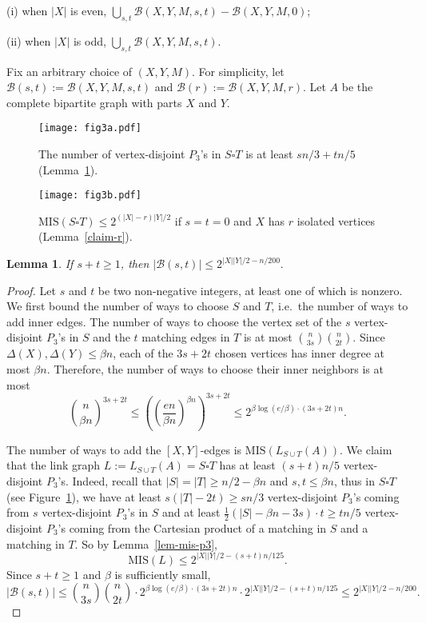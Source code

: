 \documentclass[12pt]{article}
\newtheorem{lemma}[theorem]{Lemma}
\theoremstyle{definition}
\theoremstyle{definition}
\theoremstyle{definition}
\theoremstyle{definition}
\theoremstyle{definition}
\theoremstyle{definition}
\theoremstyle{definition}
\newcommand{\De}{\Delta}
\newcommand{\cB}{\mathcal{B}}
\newcommand{\3}{\bf{3}}
\newcommand{\MIS}{\mathrm{MIS}}
\newcommand{\setm}{-}
\begin{document}
(i) when $|X|$ is even, $\bigcup_{s,t}\cB(X,Y,M,s,t)\setm \cB(X,Y,M,0)$;

(ii) when $|X|$ is odd, $\bigcup_{s,t}\cB(X,Y,M,s,t)$.

Fix an arbitrary choice of $(X,Y,M)$. For simplicity, let $\cB(s,t):=\cB(X,Y,M,s,t)$ and $\cB(r):=\cB(X,Y,M,r)$. Let $A$ be the complete bipartite graph with parts $X$ and $Y$. 

\begin{figure*}[t!]
    \centering
    \begin{subfigure}[t]{0.43\textwidth}
        \centering
        \texttt{[image: fig3a.pdf]}
        \caption{The number of vertex-disjoint $P_3$'s in $S\square T$ is at least $sn/3+tn/5$ (Lemma~\ref{claim-st}).}\label{fig3a}
    \end{subfigure}
    \hspace{0.1\textwidth}
        \begin{subfigure}[t]{0.43\textwidth}
        \centering
        \texttt{[image: fig3b.pdf]}
    \caption{$\MIS(S\square T)\le 2^{(|X|-r)|Y|/2}$ if $s=t=0$ and $X$ has $r$ isolated vertices  (Lemma~\ref{claim-r}).} \label{fig3b}
    \end{subfigure}
   \caption{}
\end{figure*}

\begin{lemma}\label{claim-st}
If $s+t\geq 1$, then $|\cB(s,t)|\le 2^{|X||Y|/2-n/200}.$
\end{lemma}

\begin{proof}
Let $s$ and $t$ be two non-negative integers, at least one of which is nonzero. We first bound the number of ways to choose $S$ and $T$, i.e.~the number of ways to add inner edges. The number of ways to choose the vertex set of the $s$ vertex-disjoint $P_3$'s in $S$ and the $t$ matching edges in $T$ is at most $\binom{n}{3s}\binom{n}{2t}$. Since $\De(X),\De(Y)\le\beta n$, each of the $3s+2t$ chosen vertices has inner degree at most $\beta  n$. Therefore, the number of ways to choose their inner neighbors is at most
$$\binom{n}{\beta  n}^{3s+2t}\leq \left( \left(\frac{e n}{\beta  n}\right)^{\beta  n}\right)^{3s+2t}\leq 2^{\beta \log(e/\beta )\cdot (3s+2t)n}.$$
 
 The number of ways to add the $[X,Y]$-edges is $\MIS(L_{S\cup T}(A))$. We claim that the link graph $L:=L_{S\cup T}(A)=S\square T$ has at least $(s+t)n/5$ vertex-disjoint $P_3$'s. Indeed, recall that $|S|=|T|\ge n/2-\beta n$ and $s,t\le\beta n$, thus in $S\square T$ (see Figure~\ref{fig3a}), we have at least $s(|T|-2t)\geq sn/3$ vertex-disjoint $P_3$'s coming from $s$ vertex-disjoint $P_3$'s in $S$ and at least $\frac{1}{2}(|S|-\beta n-3s)\cdot t \geq tn/5$  vertex-disjoint $P_3$'s coming from the Cartesian product of a matching in $S$ and a matching in $T$. So by Lemma~\ref{lem-mis-p3}, $$\MIS(L)\leq 2^{|X||Y|/2-(s+t)n/125}.$$
Since $s+t\ge 1$ and $\beta $ is sufficiently small,
$$|\cB(s,t)|\leq \binom{n}{3s}\binom{n}{2t}\cdot 2^{\beta \log(e/\beta )\cdot (3s+2t)n}\cdot  2^{|X||Y|/2-(s+t)n/125}\leq 2^{|X||Y|/2-n/200}.$$
\end{proof}
\end{document}
